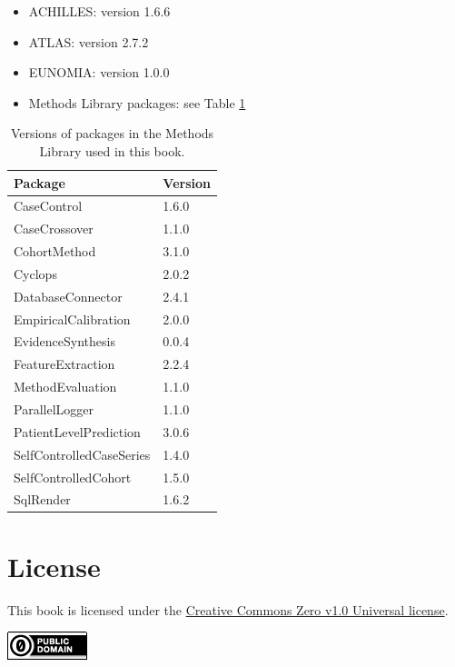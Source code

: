 \documentclass[11pt]{book}
\providecommand{\tightlist}{%
  \setlength{\itemsep}{0pt}\setlength{\parskip}{0pt}}
\theoremstyle{definition}
\theoremstyle{definition}
\theoremstyle{definition}
\theoremstyle{remark}
\begin{document}
\begin{itemize}
\tightlist
\item
  ACHILLES: version 1.6.6
\item
  ATLAS: version 2.7.2
\item
  EUNOMIA: version 1.0.0
\item
  Methods Library packages: see Table \ref{tab:packageVersions}
\end{itemize}

\begin{table}[t]

\caption{\label{tab:packageVersions}Versions of packages in the Methods Library used in this book.}
\centering
\begin{tabular}{ll}
\toprule
Package & Version\\
\midrule
CaseControl & 1.6.0\\
CaseCrossover & 1.1.0\\
CohortMethod & 3.1.0\\
Cyclops & 2.0.2\\
DatabaseConnector & 2.4.1\\
\addlinespace
EmpiricalCalibration & 2.0.0\\
EvidenceSynthesis & 0.0.4\\
FeatureExtraction & 2.2.4\\
MethodEvaluation & 1.1.0\\
ParallelLogger & 1.1.0\\
\addlinespace
PatientLevelPrediction & 3.0.6\\
SelfControlledCaseSeries & 1.4.0\\
SelfControlledCohort & 1.5.0\\
SqlRender & 1.6.2\\
\bottomrule
\end{tabular}
\end{table}

\hypertarget{license}{%
\section*{License}\label{license}}

This book is licensed under the \href{http://creativecommons.org/publicdomain/zero/1.0/}{Creative Commons Zero v1.0 Universal license}.

\includegraphics{images/Preface/cc0.png}
\end{document}

